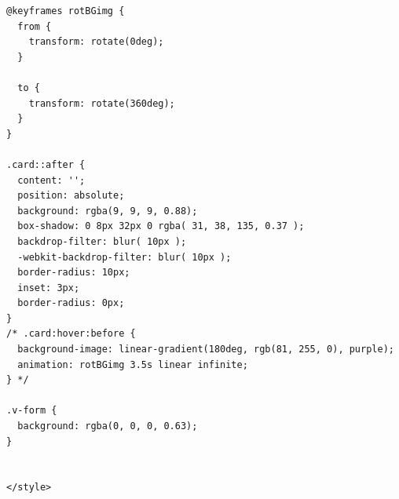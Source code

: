 \documentclass{altsu-report}
\begin{document}
\begin{code}
\begin{verbatim}
@keyframes rotBGimg {
  from {
    transform: rotate(0deg);
  }

  to {
    transform: rotate(360deg);
  }
}

.card::after {
  content: '';
  position: absolute;
  background: rgba(9, 9, 9, 0.88);
  box-shadow: 0 8px 32px 0 rgba( 31, 38, 135, 0.37 );
  backdrop-filter: blur( 10px );
  -webkit-backdrop-filter: blur( 10px );
  border-radius: 10px;
  inset: 3px;
  border-radius: 0px;
}
/* .card:hover:before {
  background-image: linear-gradient(180deg, rgb(81, 255, 0), purple);
  animation: rotBGimg 3.5s linear infinite;
} */

.v-form {
  background: rgba(0, 0, 0, 0.63);
}


</style>
\end{verbatim}
\end{code}
\end{document}
